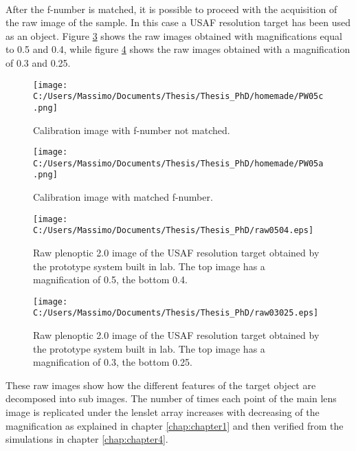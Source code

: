 \\
After the f-number is matched, it is possible to proceed with the acquisition of the raw image of the sample. In this case a USAF resolution target has been used as an object. Figure \ref{fig:rawreal} shows the raw images obtained with magnifications equal to 0.5 and 0.4, while figure \ref{fig:rawreal2} shows the raw images obtained with a magnification of 0.3 and 0.25.
\begin{figure}[H]
	\centering
	\texttt{[image: C:/Users/Massimo/Documents/Thesis/Thesis\_PhD/homemade/PW05c.png]}
	\caption{\label{fig:calibrationimg1} Calibration image with f-number not matched. }
\end{figure}
\begin{figure}[H]
	\centering
	\texttt{[image: C:/Users/Massimo/Documents/Thesis/Thesis\_PhD/homemade/PW05a.png]}
	\caption{\label{fig:calibrationimg2} Calibration image with matched f-number. }
\end{figure}
\begin{figure}[H]
	\centering
	\texttt{[image: C:/Users/Massimo/Documents/Thesis/Thesis\_PhD/raw0504.eps]}
	\caption{\label{fig:rawreal} Raw plenoptic 2.0 image of the USAF resolution target obtained by the prototype system built in lab. The top image has a magnification of 0.5, the bottom 0.4. }
\end{figure}
\begin{figure}[H]
	\centering
	\texttt{[image: C:/Users/Massimo/Documents/Thesis/Thesis\_PhD/raw03025.eps]}
	\caption{\label{fig:rawreal2} Raw plenoptic 2.0 image of the USAF resolution target obtained by the prototype system built in lab. The top image has a magnification of 0.3, the bottom 0.25. }
\end{figure}
These raw images show how the different features of the target object are decomposed into sub images. The number of times each point of the main lens image is replicated under the lenslet array increases with decreasing of the magnification as explained in chapter \ref{chap:chapter1} and then verified from the simulations in chapter \ref{chap:chapter4}.
\newpage 
